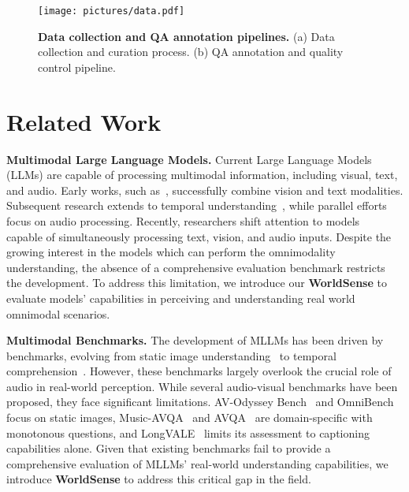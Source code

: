 
\begin{figure}[htbp]
  \vspace{-1mm}
  \centering
  \texttt{[image: pictures/data.pdf]}
  \caption{\textbf{Data collection and QA annotation pipelines.} 
  (a) Data collection and curation process. (b) QA annotation and quality control pipeline.
  }
  \label{fig:data_anno}
  \vspace{-6mm}
\end{figure}

\section{Related Work}
\textbf{Multimodal Large Language Models.} 
Current Large Language Models (LLMs) are capable of processing multimodal information, including visual, text, and audio. Early works, such as~\cite{zhang2023llama,liu2024visual,zhu2023minigpt,driess2023palm,wang2024visionllm,pi2023detgpt}, successfully combine vision and text modalities. Subsequent research extends to temporal understanding~\cite{wang2024emu3,hurst2024gpt,team2024gemini,liu2024nvila,wang2024qwen2,wang2024longllava,li2024llava,fang2024vila,xu2024slowfast,zhang2024internlm,tong2024cambrian,chen2024far,lu2024deepseek,liu2024llava}, while parallel efforts~\cite{tang2023salmonn,chu2023qwen,chu2024qwen2} focus on audio processing. Recently, researchers shift attention to models~\cite{cheng2024videollama,sun2024video,team2024gemini,lu2024unified,team2024reka} capable of simultaneously processing text, vision, and audio inputs. Despite the growing interest in the models which can perform the omnimodality understanding, the absence of a comprehensive evaluation benchmark restricts the development. To address this limitation, we introduce our \textbf{WorldSense} to evaluate models' capabilities in perceiving and understanding real world omnimodal scenarios.




\textbf{Multimodal Benchmarks.} 
The development of MLLMs has been driven by benchmarks, evolving from static image understanding~\cite{zhang2024mme,liu2025mmbench,li2023seed,li2024seed,fu2024mmecomprehensiveevaluationbenchmark,yue2024mmmu} to temporal comprehension~\cite{li2024mvbench,liu2024tempcompass,song2024moviechat,zhou2024mlvu,fang2024mmbench,fu2024video,he2024mmworld,wang2024lvbench,xu2017video,yu2019activitynet,lin2024streamingbench,chandrasegaran2024hourvideo}. However, these benchmarks largely overlook the crucial role of audio in real-world perception. While several audio-visual benchmarks have been proposed, they face significant limitations. AV-Odyssey Bench~\cite{gong2024av} and OmniBench~\cite{li2024omnibench} focus on static images, Music-AVQA~\cite{li2022learning} and AVQA~\cite{yang2022avqa} are domain-specific with monotonous questions, and LongVALE~\cite{geng2024longvale} limits its assessment to captioning capabilities alone. Given that existing benchmarks fail to provide a comprehensive evaluation of MLLMs' real-world understanding capabilities, we introduce \textbf{WorldSense} to address this critical gap in the field.


